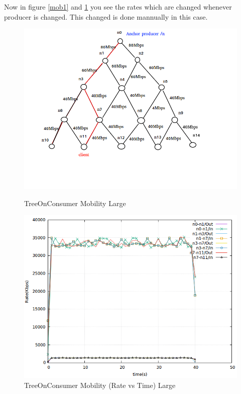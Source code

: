 Now in figure \ref{mob1} and \ref{mob2} you see the rates which are changed whenever producer is changed. This changed is done mannually in this case.



\begin{figure}[H]

\begin{center}

\includegraphics[scale = 0.5]{Figures/Mob2.png}

\caption{TreeOnConsumer Mobility Large} \label{Mob2} 


\includegraphics[scale = 0.4]{Figures/mob2.png}

\caption{TreeOnConsumer Mobility (Rate vs Time) Large} \label{mob2} 


\end{center}

\end{figure}

